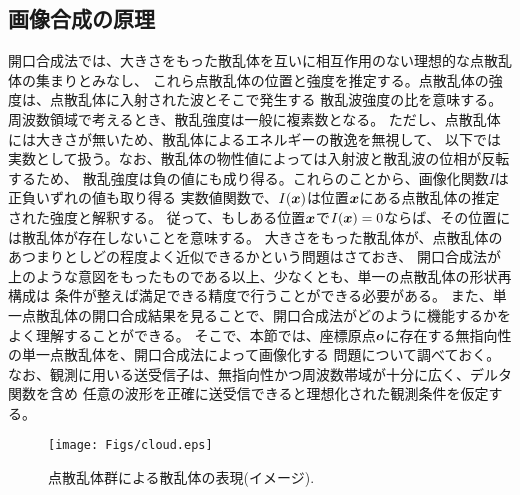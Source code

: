 \documentclass[10pt,a4j,dvipdfmx]{jarticle}
\begin{document}
\subsection{画像合成の原理}
開口合成法では、大きさをもった散乱体を互いに相互作用のない理想的な点散乱体の集まりとみなし、
これら点散乱体の位置と強度を推定する。点散乱体の強度は、点散乱体に入射された波とそこで発生する
散乱波強度の比を意味する。周波数領域で考えるとき、散乱強度は一般に複素数となる。
ただし、点散乱体には大きさが無いため、散乱体によるエネルギーの散逸を無視して、
以下では実数として扱う。なお、散乱体の物性値によっては入射波と散乱波の位相が反転するため、
散乱強度は負の値にも成り得る。これらのことから、画像化関数$I$は正負いずれの値も取り得る
実数値関数で、$I(\mbox{\boldmath $x$})$は位置$\mbox{\boldmath $x$}$にある点散乱体の推定された強度と解釈する。
従って、もしある位置$\mbox{\boldmath $x$}$で$I(\mbox{\boldmath $x$})=0$ならば、その位置には散乱体が存在しないことを意味する。
大きさをもった散乱体が、点散乱体のあつまりとしどの程度よく近似できるかという問題はさておき、
開口合成法が上のような意図をもったものである以上、少なくとも、単一の点散乱体の形状再構成は
条件が整えば満足できる精度で行うことができる必要がある。
また、単一点散乱体の開口合成結果を見ることで、開口合成法がどのように機能するかをよく理解することができる。
そこで、本節では、座標原点$\mbox{\boldmath $o$}$に存在する無指向性の単一点散乱体を、開口合成法によって画像化する
問題について調べておく。
なお、観測に用いる送受信子は、無指向性かつ周波数帯域が十分に広く、デルタ関数を含め
任意の波形を正確に送受信できると理想化された観測条件を仮定する。
\begin{figure}[h]
	\begin{center}
	\texttt{[image: Figs/cloud.eps]} 
	\end{center}
	\caption{点散乱体群による散乱体の表現(イメージ).} 
	\label{fig:cloud}
\end{figure}
\end{document}
